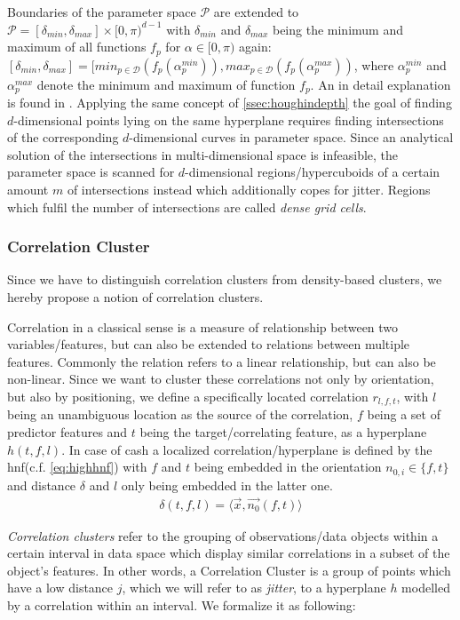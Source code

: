Boundaries of the parameter space $\mathcal{P}$ are extended to $\mathcal{P} = [\delta_{min}, \delta_{max}]\times [0,\pi)^{d-1}$ with $\delta_{min}$ and $\delta_{max}$ being the minimum and maximum of all functions $f_p$ for $\alpha \in [0,\pi)$ again: $[\delta_{min}, \delta_{max}] = [min_{p \in \mathcal{D}}(f_p(\alpha_p^{min})), max_{p \in \mathcal{D}}(f_p(\alpha_p^{max}))$, where $\alpha_p^{min}$ and $\alpha_p^{max}$ denote the minimum and maximum of function $f_p$. An in detail explanation is found in \textcite{CASHachtert2008robust}.
Applying the same concept of \autoref{ssec:houghindepth} the goal of finding $d$-dimensional points lying on the same hyperplane requires finding intersections of the corresponding $d$-dimensional curves in parameter space. Since an analytical solution of the intersections in multi-dimensional space is infeasible, the parameter space is scanned for $d$-dimensional regions/hypercuboids of a certain amount $m$ of intersections instead which additionally copes for jitter. Regions which fulfil the number of intersections are called \textit{dense grid cells}.

\subsubsection*{Correlation Cluster}
Since we have to distinguish correlation clusters from density-based clusters, we hereby propose a notion of correlation clusters.

Correlation in a classical sense is a measure of relationship between two variables/features, but can also be extended to relations between multiple features. Commonly the relation refers to a linear relationship, but can also be non-linear. Since we want to cluster these correlations not only by orientation, but also by positioning, we define a specifically located correlation $r_{l,f,t}$, with $l$ being an unambiguous location as the source of the correlation, $f$ being a set of predictor features and $t$ being the target/correlating feature, as a hyperplane $h(t,f,l)$. In case of \gls{cash} a localized correlation/hyperplane is defined by the \gls{hnf}(c.f. \autoref{eq:highhnf}) with $f$ and $t$ being embedded in the orientation $n_{0,i} \in \{f,t\}$ and distance $\delta$ and $l$ only being embedded in the latter one. 
\begin{align}
    \delta(t,f,l) = \langle \vec{x},\vec{n_0}(f,t) \rangle
\end{align}

\textit{Correlation clusters} refer to the grouping of observations/data objects within a certain interval in data space which display similar correlations in a subset of the object's features. In other words, a Correlation Cluster is a group of points which have a low distance $j$, which we will refer to as \textit{jitter}, to a hyperplane $h$ modelled by a correlation within an interval. We formalize it as following:

